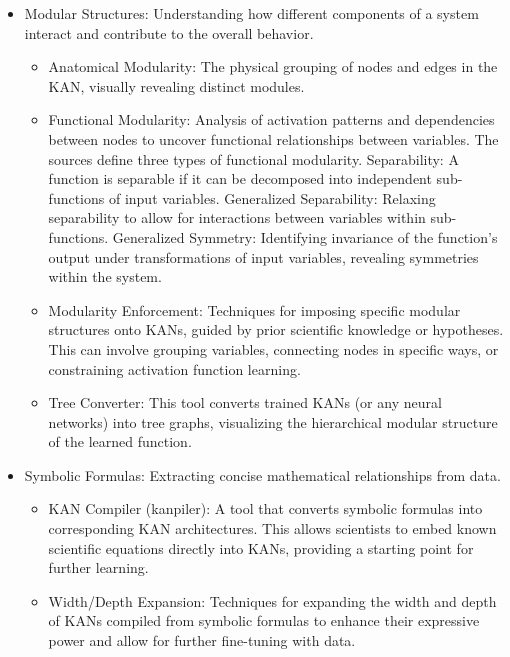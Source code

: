 \begin{itemize}
    \item Modular Structures: Understanding how different components of a system interact
          and contribute to the overall behavior.
          \begin{itemize}
              \item Anatomical Modularity: The physical grouping of nodes and edges in the KAN,
                    visually revealing distinct modules.
              \item Functional Modularity: Analysis of activation patterns and dependencies between
                    nodes to uncover functional relationships between variables. The sources define
                    three types of functional modularity. Separability: A function is separable if
                    it can be decomposed into independent sub-functions of input variables.
                    Generalized Separability: Relaxing separability to allow for interactions
                    between variables within sub-functions. Generalized Symmetry: Identifying
                    invariance of the function's output under transformations of input variables,
                    revealing symmetries within the system.
              \item Modularity Enforcement: Techniques for imposing specific modular structures
                    onto KANs, guided by prior scientific knowledge or hypotheses. This can involve
                    grouping variables, connecting nodes in specific ways, or constraining
                    activation function learning.
              \item Tree Converter: This tool converts trained KANs (or any neural networks) into
                    tree graphs, visualizing the hierarchical modular structure of the learned
                    function.
          \end{itemize}
    \item Symbolic Formulas: Extracting concise mathematical relationships from data.
          \begin{itemize}
              \item KAN Compiler (kanpiler): A tool that converts symbolic formulas into
                    corresponding KAN architectures. This allows scientists to embed known
                    scientific equations directly into KANs, providing a starting point for further
                    learning.
              \item Width/Depth Expansion: Techniques for expanding the width and depth of KANs
                    compiled from symbolic formulas to enhance their expressive power and allow for
                    further fine-tuning with data.
          \end{itemize}
\end{itemize}

